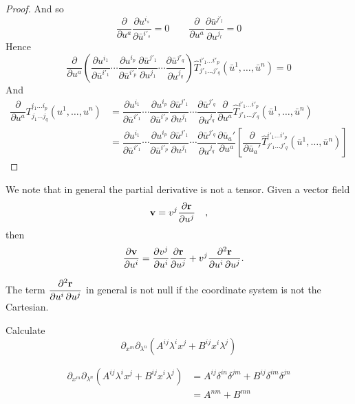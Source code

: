 \begin{proof}
And so 
   \[
\dfrac{\partial}{\partial u^a}\dfrac{\partial u^{i_s}}{\partial \bar{u}^{i'_s}}=0 \qquad \dfrac{\partial}{\partial u^a}\dfrac{\partial \bar{u}^{j'_l}}{\partial u^{j_l}}=0
   \]
Hence    
\[\dfrac{\partial}{\partial u^a}\left( \dfrac{\partial u^{i_1}}{\partial \bar{u}^{i'_1}}
\cdots
\dfrac{\partial u^{i_p}}{\partial \bar{u}^{i'_p}}
\dfrac{\partial \bar{u}^{j'_{1}}}{\partial u^{j_{1}}}
\cdots
\dfrac{\partial \bar{u}^{j'_q}}{\partial u^{j_q}}\right)
\hat{T}^{i'_1\dots i'_p}_{j'_{1}\dots j'_q}(\bar{u}^1,\ldots,\bar{u}^n) =0\]   
And 
\begin{align}
\dfrac{\partial}{\partial u^a}T^{i_1\dots i_p}_{j_1\dots j_q}(u^1,\ldots,u^n) & = \dfrac{\partial u^{i_1}}{\partial \bar{u}^{i'_1}}
\cdots
\dfrac{\partial u^{i_p}}{\partial \bar{u}^{i'_p}}
\dfrac{\partial \bar{u}^{j'_{1}}}{\partial u^{j_{1}}}
\cdots
\dfrac{\partial \bar{u}^{j'_q}}{\partial u^{j_q}} \dfrac{\partial}{\partial u^a}
\hat{T}^{i'_1\dots i'_p}_{j'_{1}\dots j'_q}(\bar{u}^1,\ldots,\bar{u}^n) \\
&= \dfrac{\partial u^{i_1}}{\partial \bar{u}^{i'_1}}
\cdots
\dfrac{\partial u^{i_p}}{\partial \bar{u}^{i'_p}}
\dfrac{\partial \bar{u}^{j'_{1}}}{\partial u^{j_{1}}}
\cdots
\dfrac{\partial \bar{u}^{j'_q}}{\partial u^{j_q}} \dfrac{\partial \bar{u}_a'}{\partial u^a} \left[ \dfrac{\partial}{\partial \bar{u}_a'}
\hat{T}^{i'_1\dots i'_p}_{j'_{1}\dots j'_q}(\bar{u}^1,\ldots,\bar{u}^n)\right]
\end{align}


\end{proof}

\begin{remark} We note that in general the partial derivative is not a tensor.  Given a vector field 
\[\mathbf{ v} = v^j \dfrac{\partial \mathbf{ r}}{\partial u^j}\quad,\] then
\[\quad\dfrac{\partial\mathbf{ v}}{\partial u^i} = \dfrac{\partial v^j}{\partial u^i}  \dfrac{\partial \mathbf{ r}}{\partial u^j}  +  v^j \dfrac{\partial^2 \mathbf{ r}}{\partial u^i \, \partial u^j}.\]

The term $\dfrac{\partial^2 \mathbf{ r}}{\partial u^i \, \partial u^j}$ in general is not null if the coordinate system is not the Cartesian.
\end{remark}


\begin{example}
 Calculate
\[ 
\partial_{x^m} \partial_{\lambda^n} (A^{ij} \lambda^i x^j + B^{ij} x^i \lambda^j)
\]
\end{example}

\begin{solu}

\begin{align}
\partial_{x^m} \partial_{\lambda^n} (A^{ij} \lambda^i x^j + B^{ij} x^i \lambda^j)
&= A^{ij} \delta^{in} \delta^{jm} + B^{ij} \delta^{im} \delta^{jn} \\
&=A^{nm} + B^{mn}
\end{align}
\end{solu}


